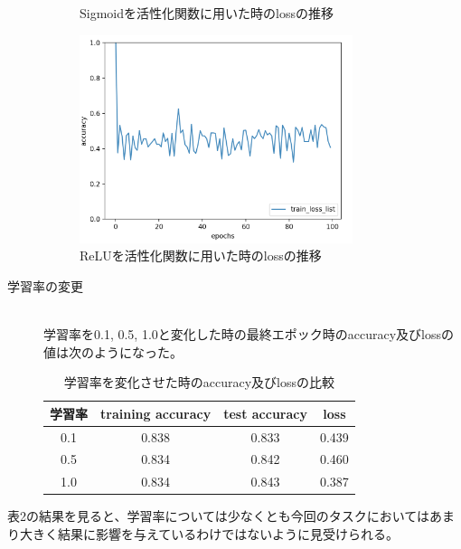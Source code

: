 \documentclass[uplatex]{jsarticle}
\begin{document}
\begin{description}
\begin{figure}[htbp]
\begin{minipage}{0.5\hsize}
\begin{center}
   \end{center}
   \caption{Sigmoidを活性化関数に用いた時のlossの推移}
   \label{fig:one}
  \end{minipage}
  \begin{minipage}{0.5\hsize}
   \begin{center}
    \includegraphics[width=80mm]{img/feature_selection.png}
   \end{center}
   \caption{ReLUを活性化関数に用いた時のlossの推移}
   \label{fig:two}
  \end{minipage}
  \end{figure}


  \item[学習率の変更]\mbox{}\\
  学習率を0.1, 0.5, 1.0と変化した時の最終エポック時のaccuracy及びlossの値は次のようになった。
  \begin{table}[htb]
    \centering
    \caption{学習率を変化させた時のaccuracy及びlossの比較}
    \begin{tabular}{|c||c|c|c|} \hline
      学習率 & training accuracy &  test accuracy & loss \\ \hline \hline
      0.1 & 0.838 & 0.833 & 0.439 \\ \hline
      0.5 & 0.834 & 0.842 & 0.460 \\ \hline
      1.0 & 0.834 & 0.843 & 0.387 \\ \hline
    \end{tabular}
  \end{table}
\end{description}
表2の結果を見ると、学習率については少なくとも今回のタスクにおいてはあまり大きく結果に影響を与えているわけではないように見受けられる。
\end{document}
